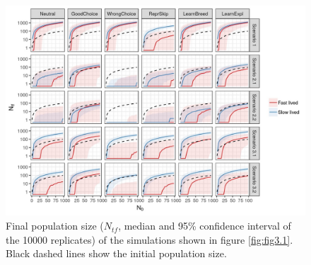 \begin{figure}
\centering
\includegraphics[width=\textwidth]{./Figures/Appendix3_2/Fig_3.jpg}
\caption[Effects on $N_{tf}$]{
Final population size ($N_{tf}$, median and 95\% confidence interval
of the 10000 replicates) of the simulations shown in figure \ref{fig:fig3.1}.
Black dashed lines show the initial population size.}
\label{fig:figApp3.2.3}
\end{figure}

